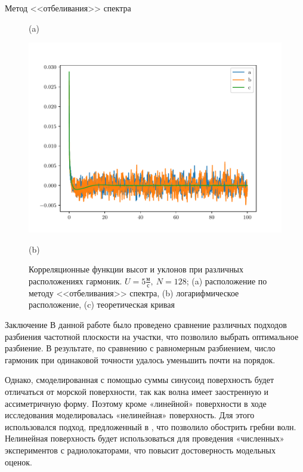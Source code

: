 \begin{frame}[t]{}
\begin{columns}[t]
\begin{column}{.48\linewidth}
\begin{block}{Метод <<отбеливания>> спектра}
\begin{figure}[h]
\begin{minipage}{0.49\linewidth}
                            (a)
                    \end{minipage}
                    \begin{minipage}{0.49\linewidth}
                            \centering
                            \includegraphics[width=\linewidth]{fig/corr2}

                            (b)
                    \end{minipage}
                    \caption{Корреляционные функции высот и уклонов  при различных расположениях гармоник. $U=5\frac{\text{м}}{\text{с}},~ N = 128$; (a) расположение по методу <<отбеливания>> спектра, (b) логарифмическое расположение, (c) теоретическая кривая }
                    \label{fig:}
                \end{figure}
        \end{block}
        \begin{block}{Заключение}
            В данной работе было проведено сравнение различных подходов разбиения частотной плоскости на участки, что позволило выбрать оптимальное разбиение. В результате, по сравнению с равномерным разбиением, число гармоник при одинаковой точности удалось уменьшить почти на порядок.

Однако, смоделированная с помощью суммы синусоид поверхность будет отличаться от морской поверхности, так как волна имеет заостренную и ассиметричную форму.
Поэтому кроме «линейной» поверхности в ходе исследования моделировалась «нелинейная» поверхность.
Для этого использовался подход, предложенный в \cite{CWM}, что позволило обострить гребни волн.
Нелинейная поверхность будет использоваться для проведения «численных» экспериментов с радиолокаторами, что повысит достоверность модельных оценок.



\end{block}
\end{column}
\end{columns}
\end{frame}

